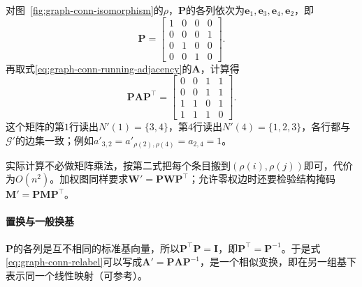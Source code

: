 对图~\ref{fig:graph-conn-isomorphism}的$\rho$，$\bm P$的各列依次为$\bm e_1,\bm e_3,\bm e_4,\bm e_2$，即
\[
\bm P=
\begin{bmatrix}
1&0&0&0\\
0&0&0&1\\
0&1&0&0\\
0&0&1&0
\end{bmatrix}.
\]
再取式\eqref{eq:graph-conn-running-adjacency}的$\bm A$，计算得
\[
\bm P\bm A\bm P^{\top}=
\begin{bmatrix}
0&0&1&1\\
0&0&1&1\\
1&1&0&1\\
1&1&1&0
\end{bmatrix}.
\]
这个矩阵的第$1$行读出$N'(1)=\{3,4\}$，第$4$行读出$N'(4)=\{1,2,3\}$，各行都与$\mathcal G'$的边集一致；例如$a'_{3,2}=a'_{\rho(2),\rho(4)}=a_{2,4}=1$。

实际计算不必做矩阵乘法，按第二式把每个条目搬到$(\rho(i),\rho(j))$即可，代价为$O(n^2)$。加权图同样要求$\bm W'=\bm P\bm W\bm P^{\top}$；允许零权边时还要检验结构掩码$\bm M'=\bm P\bm M\bm P^{\top}$。

\paragraph{置换与一般换基}
$\bm P$的各列是互不相同的标准基向量，所以$\bm P^{\top}\bm P=\bm I$，即$\bm P^{\top}=\bm P^{-1}$。于是式\eqref{eq:graph-conn-relabel}可以写成$\bm A'=\bm P\bm A\bm P^{-1}$，是一个相似变换，即在另一组基下表示同一个线性映射（可参考）。

